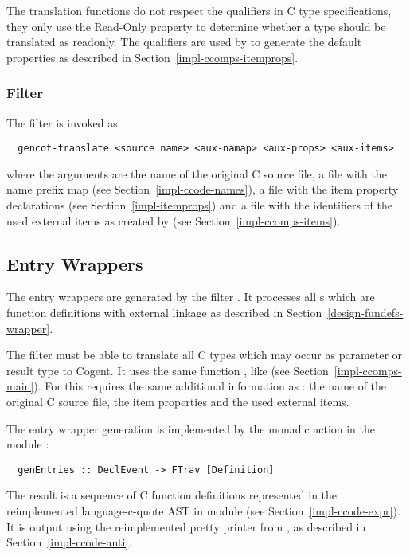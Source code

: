 The translation functions do not respect the  qualifiers in C type specifications, they only use the 
Read-Only property to determine whether a type should be translated as readonly. The  qualifiers are 
used by  to generate the default properties as described in Section~\ref{impl-ccomps-itemprops}. 

\subsubsection{Filter }

The filter  is invoked as
\begin{verbatim}
  gencot-translate <source name> <aux-namap> <aux-props> <aux-items>
\end{verbatim}
where the arguments are the name of the original C source file, a file  with the name prefix map 
(see Section~\ref{impl-ccode-names}), a file  with the item property declarations (see 
Section~\ref{impl-itemprops}) and a file  with the identifiers of the used external items as created 
by  (see Section~\ref{impl-ccomps-items}).

\subsection{Entry Wrappers}
\label{impl-ccomps-entries}

The entry wrappers are generated by the filter . It processes all s
which are function definitions with external linkage as described in Section~\ref{design-fundefs-wrapper}.

The filter must be able to translate all C types which may occur as parameter or result type to Cogent. It
uses the same function , like  (see Section~\ref{impl-ccomps-main}).
For this  requires the same additional information as : the 
name of the original C source file, the item properties and the used external items.

The entry wrapper generation is implemented by the monadic action  in the module 
:
\begin{verbatim}
  genEntries :: DeclEvent -> FTrav [Definition]
\end{verbatim}
The result is a sequence of C function definitions represented in the reimplemented language-c-quote AST
in module  (see Section~\ref{impl-ccode-expr}). It is output using the reimplemented 
pretty printer from , as described in Section~\ref{impl-ccode-anti}.

